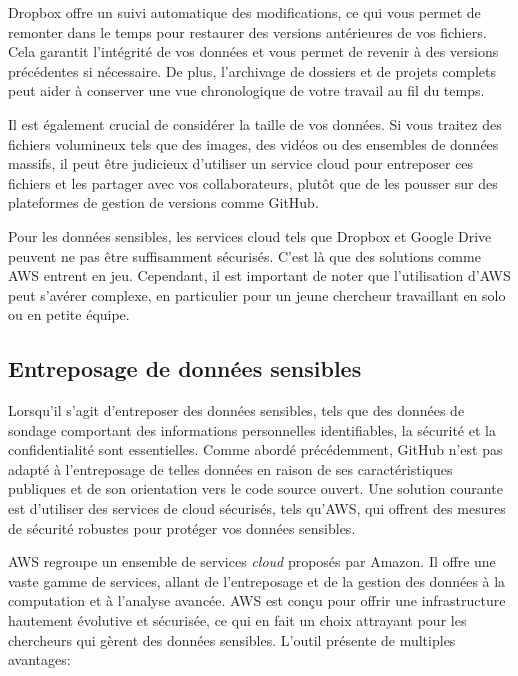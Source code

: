 \documentclass[
  letterpaper,
]{scrbook}
\begin{document}
Dropbox offre un suivi automatique des modifications, ce qui vous permet
de remonter dans le temps pour restaurer des versions antérieures de vos
fichiers. Cela garantit l'intégrité de vos données et vous permet de
revenir à des versions précédentes si nécessaire. De plus, l'archivage
de dossiers et de projets complets peut aider à conserver une vue
chronologique de votre travail au fil du temps.

Il est également crucial de considérer la taille de vos données. Si vous
traitez des fichiers volumineux tels que des images, des vidéos ou des
ensembles de données massifs, il peut être judicieux d'utiliser un
service cloud pour entreposer ces fichiers et les partager avec vos
collaborateurs, plutôt que de les pousser sur des plateformes de gestion
de versions comme GitHub.

Pour les données sensibles, les services cloud tels que Dropbox et
Google Drive peuvent ne pas être suffisamment sécurisés. C'est là que
des solutions comme AWS entrent en jeu. Cependant, il est important de
noter que l'utilisation d'AWS peut s'avérer complexe, en particulier
pour un jeune chercheur travaillant en solo ou en petite équipe.

\hypertarget{entreposage-de-donnuxe9es-sensibles}{%
\subsection{Entreposage de données
sensibles}\label{entreposage-de-donnuxe9es-sensibles}}

Lorsqu'il s'agit d'entreposer des données sensibles, tels que des
données de sondage comportant des informations personnelles
identifiables, la sécurité et la confidentialité sont essentielles.
Comme abordé précédemment, GitHub n'est pas adapté à l'entreposage de
telles données en raison de ses caractéristiques publiques et de son
orientation vers le code source ouvert. Une solution courante est
d'utiliser des services de cloud sécurisés, tels qu'AWS, qui offrent des
mesures de sécurité robustes pour protéger vos données sensibles.

AWS regroupe un ensemble de services \emph{cloud} proposés par Amazon.
Il offre une vaste gamme de services, allant de l'entreposage et de la
gestion des données à la computation et à l'analyse avancée. AWS est
conçu pour offrir une infrastructure hautement évolutive et sécurisée,
ce qui en fait un choix attrayant pour les chercheurs qui gèrent des
données sensibles. L'outil présente de multiples avantages:
\end{document}
